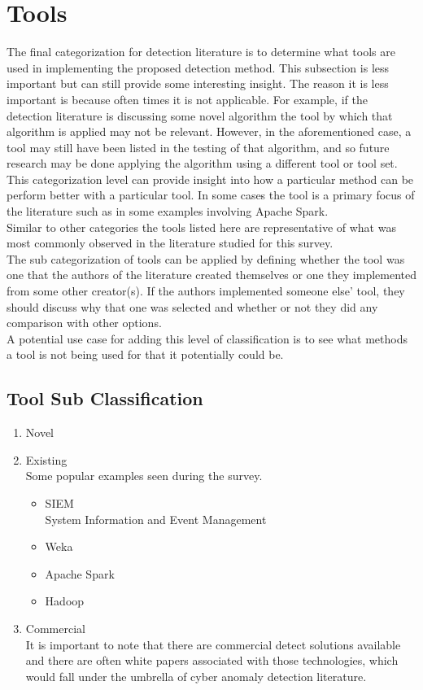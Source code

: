 \documentclass[10pt]{IEEEtran}
\begin{document}
\section{Tools}
The final categorization for detection literature is to determine what tools are used in implementing the proposed detection method. This subsection is less important but can still provide some interesting insight. The reason it is less important is because often times it is not applicable. For example, if the detection literature is discussing some novel algorithm the tool by which that algorithm is applied may not be relevant. However, in the aforementioned case, a tool may still have been listed in the testing of that algorithm, and so future research may be done applying the algorithm using a different tool or tool set.\\
This categorization level can provide insight into how a particular method can be perform better with a particular tool. In some cases the tool is a primary focus of the literature such as in some examples involving Apache Spark.\\
Similar to other categories the tools listed here are representative of what was most commonly observed in the literature studied for this survey. \\
The sub categorization of tools can be applied by defining whether the tool was one that the authors of the literature created themselves or one they implemented from some other creator(s). If the authors implemented someone else' tool, they should discuss why that one was selected and whether or not they did any comparison with other options. \\
A potential use case for adding this level of classification is to see what methods a tool is not being used for that it potentially could be.

\subsection{Tool Sub Classification}
\begin{enumerate}
    \item Novel
    \item Existing \\
    Some popular examples seen during the survey.
    \begin{itemize}
        \item SIEM \cite{kotenko2012attack}\\
        System Information and Event Management
        \item Weka \cite{asif2011filtering}\cite{thevar2017effect}
        \item Apache Spark \cite{gupta2016framework}\cite{dobson2018performance}
        \item Hadoop \cite{gupta2014big}\cite{tankard2012big}
    \end{itemize}
    \item Commercial \\
    It is important to note that there are commercial detect solutions available and there are often white papers associated with those technologies, which would fall under the umbrella of cyber anomaly detection literature.
\end{enumerate}
\end{document}
